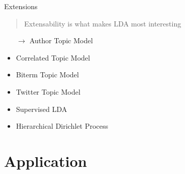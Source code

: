 \documentclass[10pt]{beamer}
\begin{document}
\begin{frame}{Extensions}
  \begin{quote}
    Extensability is what makes LDA most interesting
  \end{quote}

  \begin{itemize}
  \item[$\rightarrow$] Author Topic Model\cite{Rosen-Zvi2004}
  \item Correlated Topic Model\cite{NIPS2005_2906}
  \item Biterm Topic Model\cite{Yan2013,Chen2015}
  \item Twitter Topic Model\cite{LimCB16}
  \item Supervised LDA\cite{NIPS2007_3328}
  \item Hierarchical Dirichlet Process\cite{Teh:EtAl:06}
  \end{itemize}
\end{frame}

\section{Application}
\end{document}

